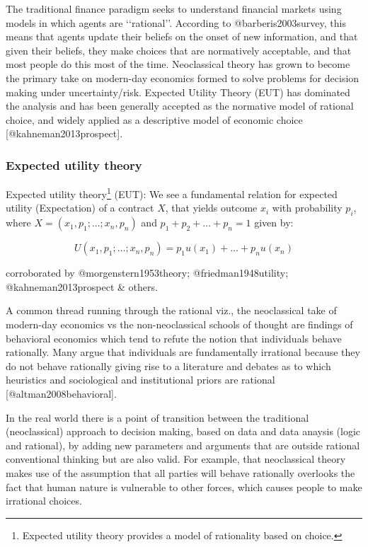 \documentclass[]{article}
\let\rmarkdownfootnote\footnote%
\def\footnote{\protect\rmarkdownfootnote}
\begin{document}
The traditional finance paradigm seeks to understand financial markets
using models in which agents are \lq\lq rational\rq\rq. According to
@barberis2003survey, this means that agents update their beliefs on the
onset of new information, and that given their beliefs, they make
choices that are normatively acceptable, and that most people do this
most of the time. Neoclassical theory has grown to become the primary
take on modern-day economics formed to solve problems for decision
making under uncertainty/risk. Expected Utility Theory (EUT) has
dominated the analysis and has been generally accepted as the normative
model of rational choice, and widely applied as a descriptive model of
economic choice {[}@kahneman2013prospect{]}.

\subsubsection{Expected utility theory}
\label{sssec:Expected utility theory}

Expected utility
theory\footnote{Expected utility theory provides a model of rationality based on choice.}
(EUT): We see a fundamental relation for expected utility (Expectation)
of a contract \(X\), that yields outcome \(x_i\) with probability
\(p_i\), where \(X = (x_1,p_1; ...; x_n,p_n)\) and
\(p_1+p_2+\ldots+p_n=1\) given by:

\begin{equation}\label{eqn1}
U(x_1,p_1;\ldots;x_n,p_n) = p_1u(x_1)+\ldots+p_nu(x_n) 
\end{equation}

corroborated by @morgenstern1953theory; @friedman1948utility;
@kahneman2013prospect \& others.

A common thread running through the rational viz., the neoclassical take
of modern-day economics vs the non-neoclassical schools of thought are
findings of behavioral economics which tend to refute the notion that
individuals behave rationally. Many argue that individuals are
fundamentally irrational because they do not behave rationally giving
rise to a literature and debates as to which heuristics and sociological
and institutional priors are rational
{[}@altman2008behavioral{]}.\medskip

In the real world there is a point of transition between the traditional
(neoclassical) approach to decision making, based on data and data
anaysis (logic and rational), by adding new parameters and arguments
that are outside rational conventional thinking but are also valid. For
example, that neoclassical theory makes use of the assumption that all
parties will behave rationally overlooks the fact that human nature is
vulnerable to other forces, which causes people to make irrational
choices.\medskip 
\end{document}
